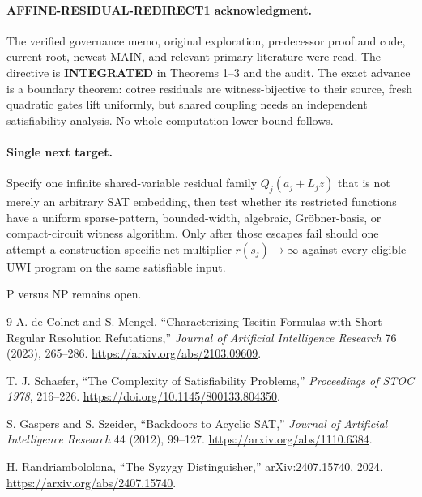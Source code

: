 \documentclass[11pt]{article}
\begin{document}
\paragraph{AFFINE-RESIDUAL-REDIRECT1 acknowledgment.}
The verified governance memo, original exploration, predecessor proof and code,
current root, newest MAIN, and relevant primary literature were read.  The
directive is \textbf{INTEGRATED} in Theorems 1--3 and the audit.  The exact
advance is a boundary theorem: cotree residuals are witness-bijective to their
source, fresh quadratic gates lift uniformly, but shared coupling needs an
independent satisfiability analysis.  No whole-computation lower bound follows.

\paragraph{Single next target.}
Specify one infinite shared-variable residual family $Q_j(a_j+L_jz)$ that is
not merely an arbitrary SAT embedding, then test whether its restricted
functions have a uniform sparse-pattern, bounded-width, algebraic,
Gr\"obner-basis, or compact-circuit witness algorithm.  Only after those
escapes fail should one attempt a construction-specific net multiplier
$r(s_j)\to\infty$ against every eligible UWI program on the same satisfiable
input.

P versus NP remains open.

\begin{thebibliography}{9}
A. de Colnet and S. Mengel,
``Characterizing Tseitin-Formulas with Short Regular Resolution Refutations,''
\emph{Journal of Artificial Intelligence Research} 76 (2023), 265--286.
\url{https://arxiv.org/abs/2103.09609}.

T. J. Schaefer,
``The Complexity of Satisfiability Problems,''
\emph{Proceedings of STOC 1978}, 216--226.
\url{https://doi.org/10.1145/800133.804350}.

S. Gaspers and S. Szeider,
``Backdoors to Acyclic SAT,''
\emph{Journal of Artificial Intelligence Research} 44 (2012), 99--127.
\url{https://arxiv.org/abs/1110.6384}.

H. Randriambololona,
``The Syzygy Distinguisher,'' arXiv:2407.15740, 2024.
\url{https://arxiv.org/abs/2407.15740}.
\end{thebibliography}
\end{document}
